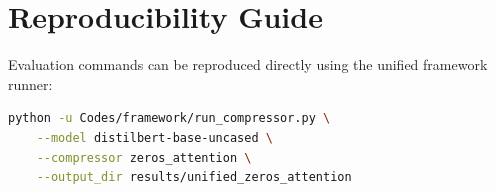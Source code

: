 \section{Reproducibility Guide}
Evaluation commands can be reproduced directly using the unified framework runner:
\begin{lstlisting}[language=bash]
python -u Codes/framework/run_compressor.py \
    --model distilbert-base-uncased \
    --compressor zeros_attention \
    --output_dir results/unified_zeros_attention
\end{lstlisting}
